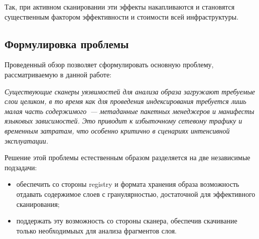 Так, при активном сканировании эти эффекты накапливаются и становятся существенным фактором эффективности и стоимости всей инфраструктуры.

\subsection{Формулировка проблемы}

Проведенный обзор позволяет сформулировать основную проблему, рассматриваемую в данной работе:

\textit{Существующие сканеры уязвимостей для анализа образа загружают требуемые слои целиком, в то время как для проведения индексирования требуется лишь малая часть содержимого~--- метаданные пакетных менеджеров и манифесты языковых зависимостей. Это приводит к избыточному сетевому трафику и временным затратам, что особенно критично в сценариях интенсивной эксплуатации.}

Решение этой проблемы естественным образом разделяется на две независимые подзадачи:

\begin{itemize}
\item обеспечить со стороны registry и формата хранения образа возможность отдавать содержимое слоев с гранулярностью, достаточной для эффективного сканирования;
\item поддержать эту возможность со стороны сканера, обеспечив скачивание только необходимыых для анализа фрагментов слоя.
\end{itemize}

\newpage
